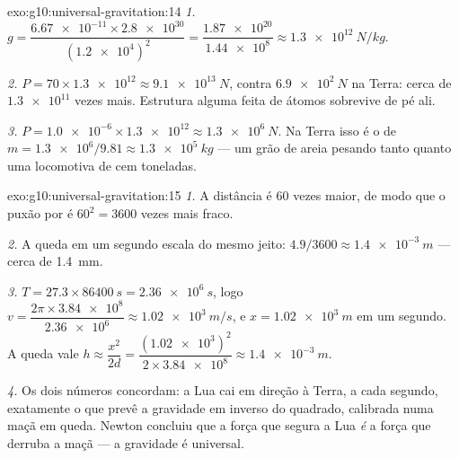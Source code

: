 \begin{solution}{exo:g10:universal-gravitation:14}
\emph{1.} $g = \dfrac{\num{6.67e-11} \times \num{2.8e30}}
{(\num{1.2e4})^2} = \dfrac{\num{1.87e20}}{\num{1.44e8}}
\approx \qty{1.3e12}{N/kg}.$

\emph{2.} $P = 70 \times \num{1.3e12} \approx \qty{9.1e13}{N}$, contra
$\qty{6.9e2}{N}$ na Terra: cerca de $\num{1.3e11}$ vezes mais. Estrutura
alguma feita de átomos sobrevive de pé ali.

\emph{3.} $P = \num{1.0e-6} \times \num{1.3e12} \approx
\qty{1.3e6}{N}$. Na Terra isso é o  de
$m = \num{1.3e6}/9.81 \approx \qty{1.3e5}{kg}$ --- um grão de areia
pesando tanto quanto uma locomotiva de cem toneladas.
\end{solution}

\begin{solution}{exo:g10:universal-gravitation:15}
\emph{1.} A distância é $60$ vezes maior, de modo que o puxão por
 é $60^2 = 3600$ vezes mais fraco.

\emph{2.} A queda em um segundo escala do mesmo jeito:
$4.9/3600 \approx \qty{1.4e-3}{m}$ --- cerca de \qty{1.4}{mm}.

\emph{3.} $T = 27.3 \times \qty{86400}{s} = \qty{2.36e6}{s}$, logo
$v = \dfrac{2\pi \times \num{3.84e8}}{\num{2.36e6}} \approx
\qty{1.02e3}{m/s}$, e $x = \qty{1.02e3}{m}$ em um segundo. A queda vale
$h \approx \dfrac{x^2}{2d}
= \dfrac{(\num{1.02e3})^2}{2 \times \num{3.84e8}}
\approx \qty{1.4e-3}{m}$.

\emph{4.} Os dois números concordam: a Lua cai em direção à Terra, a cada
segundo, exatamente o que prevê a gravidade em inverso do quadrado,
calibrada numa maçã em queda. Newton concluiu que a força que segura a
Lua \emph{é} a força que derruba a maçã --- a gravidade é universal.
\end{solution}

